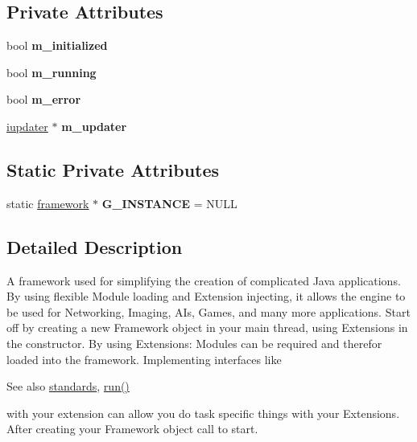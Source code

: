 \subsection*{Private Attributes}
\begin{DoxyCompactItemize}
\item 
\mbox{\label{classflounder_1_1framework_aa8d5bd06f84d96cd899a2dc0a923f6c0}} 
bool {\bfseries m\+\_\+initialized}
\item 
\mbox{\label{classflounder_1_1framework_ae35bf0984c893efe82cdedfd0a5ff99c}} 
bool {\bfseries m\+\_\+running}
\item 
\mbox{\label{classflounder_1_1framework_a330204f666427dfaeb7b0e2557b678e9}} 
bool {\bfseries m\+\_\+error}
\item 
\mbox{\label{classflounder_1_1framework_a5b02f37837a680807cb9e84e7172a6a3}} 
\hyperlink{classflounder_1_1iupdater}{iupdater} $\ast$ {\bfseries m\+\_\+updater}
\end{DoxyCompactItemize}
\subsection*{Static Private Attributes}
\begin{DoxyCompactItemize}
\item 
\mbox{\label{classflounder_1_1framework_a896bceb89f218cbfc92592b1c24929e9}} 
static \hyperlink{classflounder_1_1framework}{framework} $\ast$ {\bfseries G\+\_\+\+I\+N\+S\+T\+A\+N\+CE} = N\+U\+LL
\end{DoxyCompactItemize}


\subsection{Detailed Description}
A framework used for simplifying the creation of complicated Java applications. By using flexible Module loading and Extension injecting, it allows the engine to be used for Networking, Imaging, A\+Is, Games, and many more applications. Start off by creating a new Framework object in your main thread, using Extensions in the constructor. By using Extensions\+: Modules can be required and therefor loaded into the framework. Implementing interfaces like \begin{DoxySeeAlso}{See also}
\hyperlink{classflounder_1_1standards}{standards}, \hyperlink{classflounder_1_1framework_aa3a73c8e8f5f0c6ccef3e4de89982434}{run()}


\end{DoxySeeAlso}
with your extension can allow you do task specific things with your Extensions. After creating your Framework object call  to start. 



